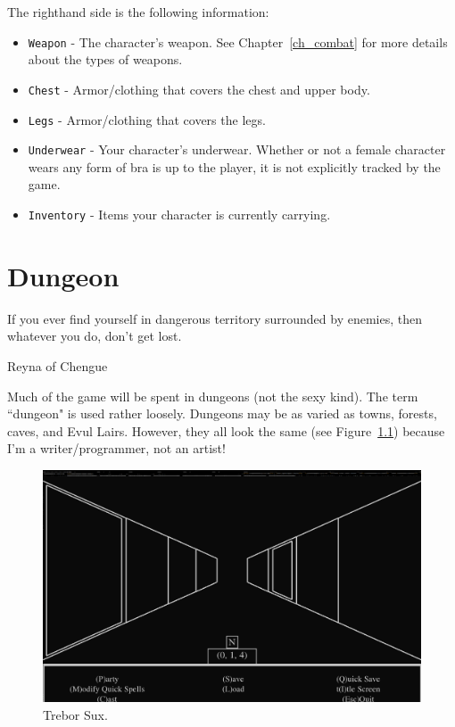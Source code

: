 \documentclass{report}
\begin{document}
\begin{itemize}
\begin{itemize}
    The righthand side is the following information:
\begin{itemize}
    \item \verb|Weapon| - The character's weapon. See Chapter~\ref{ch_combat} for
    more details about the types of weapons.
    \item \verb|Chest| - Armor/clothing that covers the chest and upper body.
    \item \verb|Legs| - Armor/clothing that covers the legs. 
    \item \verb|Underwear| - Your character's underwear. Whether or not a female
    character wears any form of bra is up to the player, it is not explicitly tracked
    by the game.
    \item \verb|Inventory| - Items your character is currently carrying.
\end{itemize}

\chapter{Dungeon}
\label{ch_dungeon}
\epigraph{If you ever find yourself in dangerous territory surrounded by enemies, 
then whatever you do, don't get lost.}{Reyna of Chengue}

    Much of the game will be spent in dungeons (not the sexy kind). The term ``dungeon" is used rather loosely. Dungeons may be as varied as towns, forests,
    caves, and Evul Lairs. However, they all look the same (see Figure~\ref{fig_dungeon}) because I'm a writer/programmer, not an artist!
    \begin{figure}[h!]
        \includegraphics[width=\textwidth]{dungeon}
        \caption{Trebor Sux.}
        \label{fig_dungeon}
    \end{figure}


\end{itemize}
\end{itemize}
\end{document}
